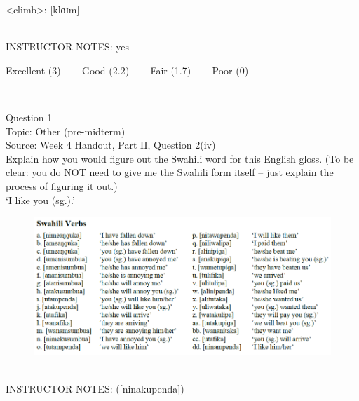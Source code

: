 \documentclass[12pt]{article}
\begin{document}
<climb>: {[klɑɪm]}


~\\
INSTRUCTOR NOTES: yes


\vfill
Excellent (3) ~~~ Good (2.2) ~~~ Fair (1.7) ~~~ Poor (0)
\newpage

\begin{center}
\textbf{{\color{red}{\HUGE END OF EXAM}}}\\

\end{center}
\newpage

\begin{center}
\textbf{{\color{blue}{\HUGE START OF EXAM\\}}}

\textbf{{\color{blue}{\HUGE Student ID: 37843\\}}}

\textbf{{\color{blue}{\HUGE 9:30\\}}}

\end{center}
\newpage

{\large Question 1}\\

Topic: Other (pre-midterm)\\
Source: Week 4 Handout, Part II, Question 2(iv)\\

Explain how you would figure out the Swahili word for this English gloss. (To be clear: you do NOT need to give me the Swahili form itself -- just explain the process of figuring it out.)\\

‘I like you (sg.).’

\begin{figure}[H]
\includegraphics{../images/swahiliverbs.png}
\end{figure}

~\\
INSTRUCTOR NOTES: ([ninakupenda])
\end{document}
